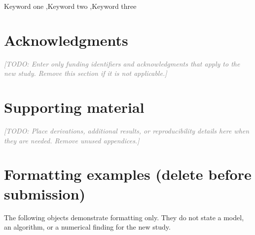 \documentclass[a4paper,fleqn]{cas-sc}
\newcommand{\placeholder}[1]{\textcolor{gray}{\textit{[TODO: #1]}}}
\newif\ifshowformattingexamples
\begin{document}
\begin{keywords}
Keyword one \sep Keyword two \sep Keyword three %
\end{keywords}
\maketitle








\section*{Acknowledgments}
\placeholder{Enter only funding identifiers and acknowledgments that apply to
the new study. Remove this section if it is not applicable.}


\appendix
\section{Supporting material}
\label{app:support}
\placeholder{Place derivations, additional results, or reproducibility details
here when they are needed. Remove unused appendices.}

\ifshowformattingexamples
\clearpage
\section{Formatting examples (delete before submission)}
\label{app:formatting}
The following objects demonstrate formatting only. They do not state a model,
an algorithm, or a numerical finding for the new study.
\end{document}
